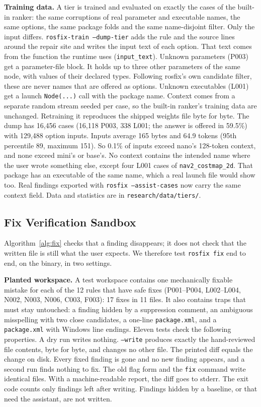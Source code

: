 \documentclass[conference]{IEEEtran}
\newcommand{\code}[1]{\texttt{#1}}
\begin{document}
\textbf{Training data.} A tier is trained and evaluated on exactly the cases of the built-in
ranker: the same corruptions of real parameter and executable names, the same options, the same
package folds and the same name-disjoint filter. Only the input differs. \code{rosfix-train
--dump-tier} adds the rule and the source lines around the repair site and writes the input text
of each option. That text comes from the function the runtime uses (\code{input\_text}). Unknown
parameters (P003) get a parameter-file block. It holds up to three other parameters of the same
node, with values of their declared types. Following rosfix's own candidate filter, these are never
names that are offered as options. Unknown executables (L001) get a launch \code{Node(...)} call
with the package name. Context comes from a separate random stream seeded per case, so the
built-in ranker's training data are unchanged. Retraining it reproduces the shipped weights file
byte for byte. The dump has 16,456 cases (16,118 P003, 338 L001; the answer is offered in 59.5\%)
with 129,488 option inputs. Inputs average 165 bytes and 64.9 tokens (95th percentile 89, maximum
151). So 0.1\% of inputs exceed nano's 128-token context, and none exceed mini's or base's. No
context contains the intended name where the user wrote something else, except four L001 cases
of \code{nav2\_costmap\_2d}. That package has an executable of the same name, which a real launch
file would show too. Real findings exported with \code{rosfix --assist-cases} now carry the same
context field. Data and statistics are in \code{research/data/tiers/}.

\subsection{Fix Verification Sandbox}
\label{sec:fixsandbox}

Algorithm~\ref{alg:fix} checks that a finding disappears; it does not check that the written
file is still what the user expects. We therefore test \code{rosfix fix} end to end, on the
binary, in two settings.

\textbf{Planted workspace.} A test workspace contains one mechanically fixable mistake for each
of the 12 rules that have safe fixes (P001--P004, L002--L004, N002, N003, N006, C003, F003): 17
fixes in 11 files. It also contains traps that must stay untouched: a finding hidden by a
suppression comment, an ambiguous misspelling with two close candidates, a one-line
\code{package.xml}, and a \code{package.xml} with Windows line endings. Eleven tests check the following properties.
A dry run writes nothing. \code{--write} produces exactly the hand-reviewed file contents, byte
for byte, and changes no other file. The printed diff equals the change on disk. Every fixed
finding is gone and no new finding appears, and a second run finds nothing to fix. The old flag
form and the \code{fix} command write identical files. With a machine-readable report, the diff
goes to stderr. The exit code counts only findings left after writing. Findings hidden by a
baseline, or that need the assistant, are not written.
\end{document}
